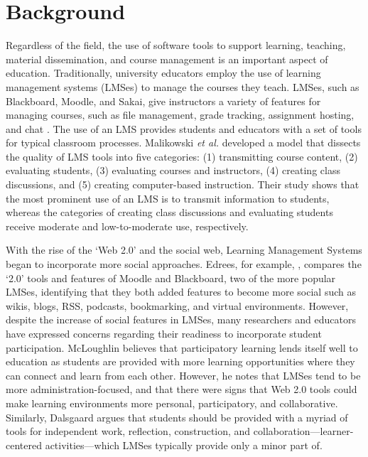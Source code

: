



\section{Background}
Regardless of the field, the use of software tools to support learning, teaching, material dissemination, and course management is an important aspect of education. Traditionally, university educators employ the use of learning management systems (LMSes) to manage the courses they teach. LMSes, such as Blackboard, Moodle, and Sakai, give instructors a variety of features for managing courses, such as file management, grade tracking, assignment hosting, and chat \cite{kumar2011comparative}. The use of an LMS provides students and educators with a set of tools for typical classroom processes. Malikowski \emph{et al.} \cite{malikowski2007model} developed a model that dissects the quality of LMS tools into five categories: (1) transmitting course content, (2) evaluating students, (3) evaluating courses and instructors, (4) creating class discussions, and (5) creating computer-based instruction. Their study shows that the most prominent use of an LMS is to transmit information to students, whereas the categories of creating class discussions and evaluating students receive moderate and low-to-moderate use, respectively.

With the rise of the `Web 2.0' and the social web, Learning Management Systems began to incorporate more social approaches. Edrees, for example, \cite{edrees2013elearning}, compares the `2.0' tools and features of Moodle and Blackboard, two of the more popular LMSes, identifying that they both added features to become more social such as wikis, blogs, RSS, podcasts, bookmarking, and virtual environments. However, despite the increase of social features in LMSes, many researchers and educators have expressed concerns regarding their readiness to incorporate student participation. McLoughlin \cite{mcloughlin2007social} believes that participatory learning lends itself well to education as students are provided with more learning opportunities where they can connect and learn from each other. However, he notes that LMSes tend to be more administration-focused, and that there were signs that Web 2.0 tools could make learning environments more personal, participatory, and collaborative. Similarly, Dalsgaard \cite{dalsgaard2006social} argues that students should be provided with a myriad of tools for independent work, reflection, construction, and collaboration---learner-centered activities---which LMSes typically provide only a minor part of.

